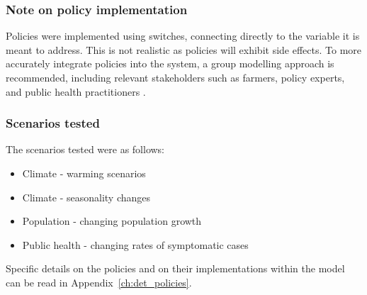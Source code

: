 \subsubsection*{Note on policy implementation}
Policies were implemented using switches, connecting directly to the variable it is meant to address. This is not realistic as policies will exhibit side effects. To more accurately integrate policies into the system,  a group modelling approach is recommended, including relevant stakeholders such as farmers, policy experts, and public health practitioners \parencite{vennix_group_1999}. %

\subsubsection{Scenarios tested}
The scenarios tested were as follows:
\begin{itemize}
    \item Climate - warming scenarios
    \item Climate - seasonality changes
    \item Population - changing population growth
    \item Public health - changing rates of symptomatic cases
\end{itemize}

Specific details on the policies and on their implementations within the model can be read in Appendix~\ref{ch:det_policies}.